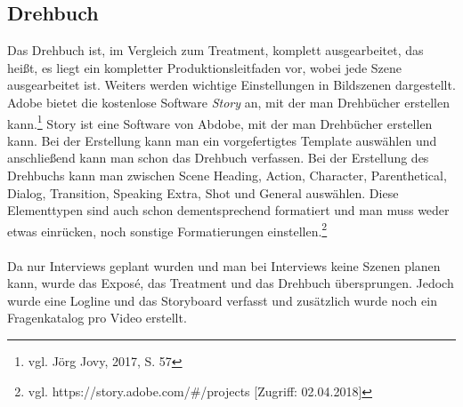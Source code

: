 \subsection{Drehbuch}
Das Drehbuch ist, im Vergleich zum Treatment, komplett ausgearbeitet, das heißt, es liegt ein kompletter Produktionsleitfaden vor, wobei jede Szene ausgearbeitet ist. Weiters werden wichtige Einstellungen in Bildszenen dargestellt. Adobe bietet die kostenlose Software \textit{Story} an, mit der man Drehbücher erstellen kann.\footnote{\label{foot}vgl. Jörg Jovy, 2017, S. 57}\newline
Story ist eine Software von Abdobe, mit der man Drehbücher erstellen kann. Bei der Erstellung kann man ein vorgefertigtes Template auswählen und anschließend kann man schon das Drehbuch verfassen. Bei der Erstellung des Drehbuchs kann man zwischen Scene Heading, Action, Character, Parenthetical, Dialog, Transition, Speaking Extra, Shot und General auswählen. Diese Elementtypen sind auch schon dementsprechend formatiert und man muss weder etwas einrücken, noch sonstige Formatierungen einstellen.\footnote{vgl. https://story.adobe.com/\#/projects [Zugriff: 02.04.2018]}\\ \\
Da nur Interviews geplant wurden und man bei Interviews keine Szenen planen kann, wurde das Expos\'{e}, das Treatment und das Drehbuch übersprungen. Jedoch wurde eine Logline und das Storyboard verfasst und zusätzlich wurde noch ein Fragenkatalog pro Video erstellt. 
